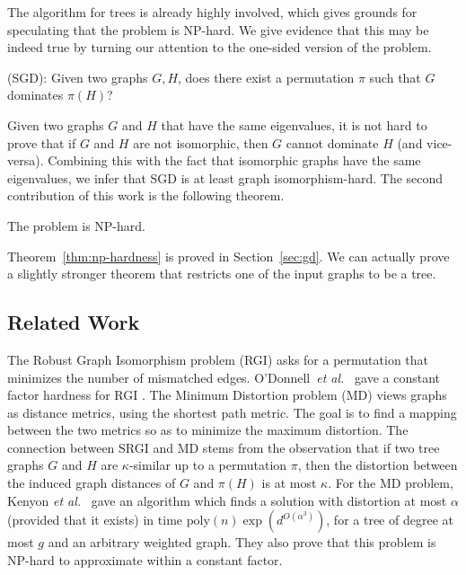 The algorithm for trees is already highly involved, which gives grounds for speculating that the problem is NP-hard. We give evidence that this may be indeed true by turning our attention to the one-sided version of the problem. 

\vspace{2ex}
{\GD} (SGD): Given two graphs $G,H$, does there exist a permutation $\pi$ such that $G$ dominates $\pi(H)$? 
\vspace{2ex}

Given two graphs $G$ and $H$ that have the same eigenvalues, it is not hard to prove
that if $G$ and $H$ are not isomorphic, then $G$ cannot dominate $H$ (and vice-versa).
Combining this with the fact that isomorphic graphs have the same eigenvalues, 
we infer that SGD is at least graph isomorphism-hard. The second contribution of this work is the following theorem.

\begin{theorem}\label{thm:np-hardness}
	The \GD problem is NP-hard.
\end{theorem}

Theorem~\ref{thm:np-hardness} is proved in Section~\ref{sec:gd}. We can actually prove a slightly stronger theorem that restricts one of the input graphs to be a tree. 


\subsection{Related Work}
The Robust Graph Isomorphism problem (RGI) asks for a permutation
that minimizes the number of mismatched edges. 
O'Donnell~{\it et al.}~\cite{odonnell} gave a constant
factor hardness for RGI . The Minimum Distortion problem (MD) views graphs as distance metrics, using
the shortest path metric. The goal is to find a mapping between
the two metrics so as to minimize the maximum
distortion. The connection
between SRGI and MD stems from the observation that if two tree graphs
$G$ and $H$ are $\kappa$-similar up to a permutation
$\pi$, then the distortion between the
induced graph distances of $G$ and $\pi(H)$ is at most $\kappa$. 
For the MD problem, Kenyon {\it et al.}~\cite{KRS} gave an
algorithm which finds a solution with distortion at most $\alpha$
(provided that it exists) in time
$\mathrm{poly} (n) \exp(d^{O(\alpha^3)})$, for a tree of degree
at most $g$ and an arbitrary weighted graph. They also prove that this problem is NP-hard to
approximate within a constant factor.

